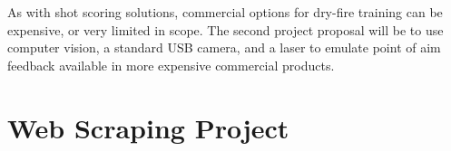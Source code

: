 \documentclass[]{article}
\begin{document}
As with shot scoring solutions, commercial options for dry-fire training can be expensive, or very limited in scope.
The second project proposal will be to use computer vision, a standard USB camera, and a laser to emulate point of aim feedback available in more expensive 
\cite{} commercial products.


\section{Web Scraping Project}

\clearpage


\end{document}
